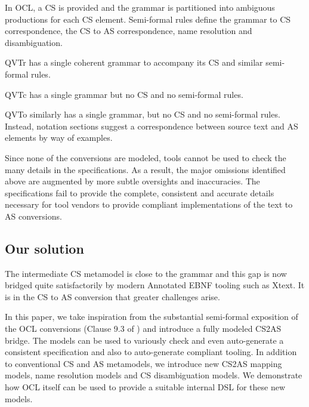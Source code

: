 \documentclass{llncs}
\begin{document}
In OCL, a CS is provided and the grammar is partitioned into ambiguous productions for each CS element. Semi-formal rules define the grammar to CS correspondence, the CS to AS correspondence, name resolution and disambiguation.

QVTr has a single coherent grammar to accompany its CS and similar semi-formal rules.

QVTc has a single grammar but no CS and no semi-formal rules.

QVTo similarly has a single grammar, but no CS and no semi-formal rules. Instead, notation sections suggest a correspondence between source text and AS elements by way of examples. 

Since none of the conversions are modeled, tools cannot be used to check the many details in the specifications. As a result, the major omissions identified above are augmented by more subtle oversights and inaccuracies. The specifications fail to provide the complete, consistent and accurate details necessary for tool vendors to provide compliant implementations of the text to AS conversions. 


\subsection{Our solution}

The intermediate CS metamodel is close to the grammar and this gap is now bridged quite satisfactorily by modern Annotated EBNF tooling such as Xtext. It is in the CS to AS conversion that greater challenges arise. 

In this paper, we take inspiration from the substantial semi-formal exposition of the OCL conversions (Clause 9.3 of \cite{omg2013ocl}) and introduce a fully modeled CS2AS bridge. The models can be used to variously check and even auto-generate a consistent specification and also to auto-generate compliant tooling. In addition to conventional CS and AS metamodels, we introduce new CS2AS mapping models, name resolution models and CS disambiguation models. We demonstrate how OCL itself can be used to provide a suitable internal DSL for these new models.
\end{document}
